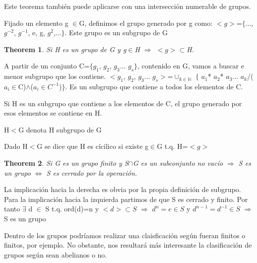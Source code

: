 \documentclass[a4paper,10pt]{apuntes}
\newtheorem{theorem}{Theorem}[section]
\newenvironment{proof}[1][Proof]{\begin{trivlist}
\item[\hskip \labelsep {\bfseries #1}]}{\end{trivlist}}
\newenvironment{definition}[1][Definition]{\begin{trivlist}
\item[\hskip \labelsep {\bfseries #1}]}{\end{trivlist}}
\newenvironment{notacion}[1][Notacion:]{\begin{trivlist}
\item[\hskip \labelsep {\bfseries #1}]}{\end{trivlist}}
\begin{document}
  Este teorema también puede aplicarse con una intersección numerable de grupos.
  
  \begin{definition}
   Fijado un elemento g $\in$G, definimos el grupo generado por g como: $<g>$=$\{$..., $g^{-2}$, $g^{-1}$, e, g, $g^{2}$,...$\}$. Este grupo
  es un subgrupo de G
  \end{definition}
  
  \begin{theorem}
   Si H es un grupo de G y g$\in$H $\Rightarrow$ $<g>\subset$H.   
  \end{theorem}

  A partir de un conjunto C=$\{g_{1}$, $g_{2}$, $g_{3}$... $g_{s}\}$, contenido en G, vamos a buscar e menor subgrupo que los contiene.
  $<g_{1}$, $g_{2}$, $g_{3}$... $g_{s}>$=$\displaystyle \cup_{k\in\mathds{N}}$  $\{$ $a_{1}$* $a_{2}$* $a_{3}$... $a_{k}$/($a_{i}\in$C)$\wedge$($a_{i}\in C^{-1}$)$\}$. Es un subgrupo que contiene a 
  todos los elementos de C.
  
  Si H es un subgrupo que contiene a los elementos de C, el grupo generado por esos elementos se contiene en H.
  
  \begin{notacion}
   H$<$G denota H subgrupo de G
  \end{notacion}
  
  \begin{definition}
   Dado H$<$G se dice que H es cícilico si existe g$\in$G t.q. H=$<g>$ 
  \end{definition}

  \begin{theorem}
   Si G es un grupo finito y S$\cap$G es un subconjunto no vacío $\Rightarrow$ S es un grupo $\Leftrightarrow$ S es cerrado por la operación.   
  \end{theorem}
  \begin{proof}
   La implicación hacia la derecha es obvia por la propia definición de subgrupo.
   Para la implicación hacia la izquierda partimos de que S es cerrado y finito. Por tanto $\exists$ d $\in$ S t.q. ord(d)=n y $<d>\subset S$
   $\Rightarrow$ $d^{n}=e\in S$ y $d^{n-1}=d^{-1}\in S$ $\Rightarrow$ S es un grupo
  \end{proof}

  Dentro de los grupos podríamos realizar una claisficación según fueran finitos o finitos, por ejemplo. No obstante, nos resultará
  más interesante la clasificación de grupos según sean abelianos o no.
  
\end{document}
